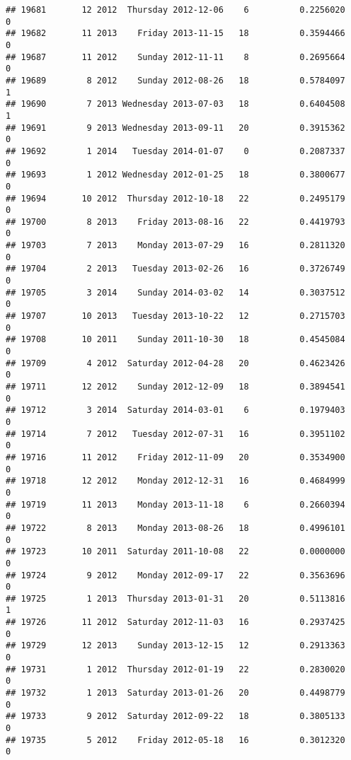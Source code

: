 \documentclass[
]{article}
\begin{document}
\begin{verbatim}
## 19681       12 2012  Thursday 2012-12-06    6          0.2256020             0
## 19682       11 2013    Friday 2013-11-15   18          0.3594466             0
## 19687       11 2012    Sunday 2012-11-11    8          0.2695664             0
## 19689        8 2012    Sunday 2012-08-26   18          0.5784097             1
## 19690        7 2013 Wednesday 2013-07-03   18          0.6404508             1
## 19691        9 2013 Wednesday 2013-09-11   20          0.3915362             0
## 19692        1 2014   Tuesday 2014-01-07    0          0.2087337             0
## 19693        1 2012 Wednesday 2012-01-25   18          0.3800677             0
## 19694       10 2012  Thursday 2012-10-18   22          0.2495179             0
## 19700        8 2013    Friday 2013-08-16   22          0.4419793             0
## 19703        7 2013    Monday 2013-07-29   16          0.2811320             0
## 19704        2 2013   Tuesday 2013-02-26   16          0.3726749             0
## 19705        3 2014    Sunday 2014-03-02   14          0.3037512             0
## 19707       10 2013   Tuesday 2013-10-22   12          0.2715703             0
## 19708       10 2011    Sunday 2011-10-30   18          0.4545084             0
## 19709        4 2012  Saturday 2012-04-28   20          0.4623426             0
## 19711       12 2012    Sunday 2012-12-09   18          0.3894541             0
## 19712        3 2014  Saturday 2014-03-01    6          0.1979403             0
## 19714        7 2012   Tuesday 2012-07-31   16          0.3951102             0
## 19716       11 2012    Friday 2012-11-09   20          0.3534900             0
## 19718       12 2012    Monday 2012-12-31   16          0.4684999             0
## 19719       11 2013    Monday 2013-11-18    6          0.2660394             0
## 19722        8 2013    Monday 2013-08-26   18          0.4996101             0
## 19723       10 2011  Saturday 2011-10-08   22          0.0000000             0
## 19724        9 2012    Monday 2012-09-17   22          0.3563696             0
## 19725        1 2013  Thursday 2013-01-31   20          0.5113816             1
## 19726       11 2012  Saturday 2012-11-03   16          0.2937425             0
## 19729       12 2013    Sunday 2013-12-15   12          0.2913363             0
## 19731        1 2012  Thursday 2012-01-19   22          0.2830020             0
## 19732        1 2013  Saturday 2013-01-26   20          0.4498779             0
## 19733        9 2012  Saturday 2012-09-22   18          0.3805133             0
## 19735        5 2012    Friday 2012-05-18   16          0.3012320             0

\end{verbatim}
\end{document}
